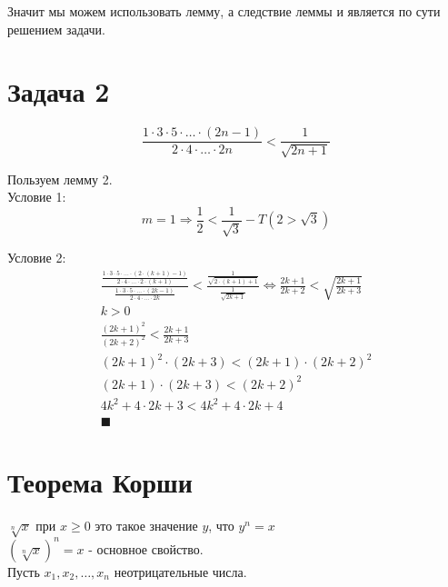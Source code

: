 \documentclass[letterpaper]{article}
\begin{document}
Значит мы можем использовать лемму, а следствие леммы и является по сути решением задачи.\\
\section{Задача 2}
\label{sec:org55ac369}
\begin{equation}
\frac{1 \cdot 3 \cdot 5 \cdot \ldots \cdot (2n - 1)}{2 \cdot 4 \cdot \ldots \cdot  2n} < \frac{1}{\sqrt{2n + 1}}
\end{equation}

Пользуем лемму 2.\\

Условие 1:\\
\begin{equation}
m = 1 \Rightarrow \frac{1}{2} < \frac{1}{\sqrt{3}} - T (2 > \sqrt{3})
\end{equation}

Условие 2:\\
\begin{equation}
\begin{aligned}
\frac{\frac{1 \cdot 3 \cdot 5 \cdot \ldots \cdot (2 \cdot (k + 1) - 1)}{2 \cdot 4 \cdot \ldots \cdot 2 \cdot (k + 1)}}{\frac{1 \cdot 3 \cdot 5 \cdot \ldots \cdot (2k - 1)}{2 \cdot 4 \cdot \ldots \cdot 2k}} < \frac{\frac{1}{\sqrt{2 \cdot (k + 1) + 1}}}{ \frac{1}{\sqrt{2k + 1}}}
\iff \frac{2k + 1}{2k + 2} < \sqrt{\frac{2k + 1}{2k + 3}} \\
\boxed{k>0} \\
\frac{(2k + 1)^2}{(2k + 2)^2} < \frac{2k + 1}{2k + 3} \\
(2k + 1)^2 \cdot (2k + 3) < (2k + 1) \cdot (2k + 2)^2 \\
(2k + 1) \cdot (2k + 3) < (2k + 2)^2 \\
4k^2 + 4 \cdot 2k + 3 < 4k^2 + 4 \cdot 2k + 4 \\
\blacksquare
\end{aligned}
\end{equation}
\section{Теорема Корши}
\label{sec:org58bc983}
\(\sqrt[n]{x}\) при \(x \geq 0\) это такое значение \(y\), что \(y^n = x\)\\

\((\sqrt[n]{x})^n = x\) - основное свойство.\\

Пусть \(x_1, x_2, \ldots, x_n\) неотрицательные числа.\\
\end{document}
